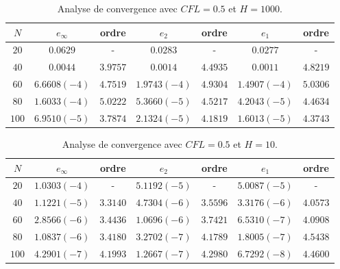 \begin{table}[h]
\begin{center}
\begin{tabular}{c|c|c|c|c|c|c}
$N$ & $e_{\infty}$ & ordre & $e_2$ & ordre & $e_1$ & ordre \\ 
\hline 
\hline
$20$ & $0.0629$ & - & $0.0283$ & - & $0.0277$ & - \\ 
\hline 
$40$ & $0.0044$ & $3.9757$ & $0.0014$ & $4.4935$ & $0.0011$ & $4.8219$ \\ 
\hline 
$60$ & $6.6608 (-4)$ & $4.7519$ & $1.9743 (-4)$ & $4.9304$ & $1.4907 (-4)$ & $5.0306$ \\
\hline 
$80$ & $1.6033 (-4)$ & $5.0222$ & $5.3660 (-5)$ & $4.5217$ & $4.2043 (-5)$ & $4.4634$ \\ 
\hline 
$100$ & $6.9510(-5)$ & $3.7874$ & $2.1324 (-5)$ & $4.1819$ & $1.6013 (-5)$ & $4.3743$  \\ 
\end{tabular} 
\caption{Analyse de convergence avec $CFL=0.5$ et $H=1000$.}
\label{CV_order4_hp1000}
\end{center}
\end{table}

\begin{table}[h]
\begin{center}
\begin{tabular}{c|c|c|c|c|c|c}
$N$ & $e_{\infty}$ & ordre & $e_2$ & ordre & $e_1$ & ordre \\ 
\hline 
\hline
$20$ & $1.0303 (-4)$ & - & $5.1192 (-5)$ & - & $5.0087 (-5)$ & - \\ 
\hline 
$40$ & $1.1221 (-5)$ & $3.3140$ & $4.7304 (-6)$ & $3.5596$ & $3.3176 (-6)$ & $4.0573$ \\ 
\hline 
$60$ & $2.8566 (-6)$ & $3.4436$ & $1.0696 (-6)$ & $3.7421$ & $6.5310 (-7)$ & $4.0908$ \\
\hline 
$80$ & $1.0837 (-6)$ & $3.4180$ & $3.2702 (-7)$ & $4.1789$ & $1.8005 (-7)$ & $4.5438$ \\ 
\hline 
$100$ & $4.2901(-7)$ & $4.1993$ & $1.2667 (-7)$ & $4.2980$ & $6.7292 (-8)$ & $4.4600$  \\ 
\end{tabular} 
\caption{Analyse de convergence avec $CFL=0.5$ et $H=10$.}
\label{CV_order8_hp10}
\end{center}
\end{table}


